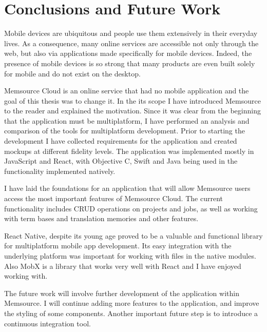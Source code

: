 \chapter{Conclusions and Future Work}

Mobile devices are ubiquitous and people use them extensively in their everyday lives. As a consequence, many online services are accessible not only through the web, but also via applications made specifically for mobile devices. Indeed, the presence of mobile devices is so strong that many products are even built solely for mobile and do not exist on the desktop.

Memsource Cloud is an online service that had no mobile application and the goal of this thesis was to change it. In the its scope I have introduced Memsource to the reader and explained the motivation. Since it was clear from the beginning that the application must be multiplatform, I have performed an analysis and comparison of the tools for multiplatform development. Prior to starting the development I have collected requirements for the application and created mockups at different fidelity levels. The application was implemented mostly in JavaScript and React, with Objective C, Swift and Java being used in the functionality implemented natively. 

I have laid the foundations for an application that will allow Memsource users access the most important features of Memsource Cloud. The current functionality includes CRUD operations on projects and jobs, as well as working with term bases and translation memories and other features.

React Native, despite its young age proved to be a valuable and functional library for multiplatform mobile app development. Its easy integration with the underlying platform was important for working with files in the native modules. Also MobX is a library that works very well with React and I have enjoyed working with.


The future work will involve further development of the application within Memsource. I will continue adding more features to the application, and improve the styling of some components. Another important future step is to introduce a continuous integration tool.